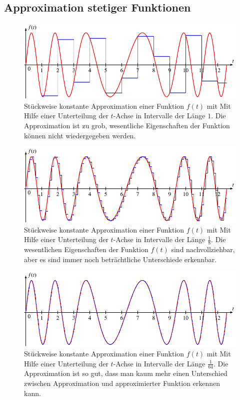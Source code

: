 \subsection{Approximation stetiger Funktionen}
\begin{figure}
\centering
\includegraphics{chapters/3-haar/images/stueckweise1.pdf}
\caption{Stückweise konstante Approximation einer Funktion $f(t)$ mit
Mit Hilfe einer Unterteilung der $t$-Achse in Intervalle der Länge $1$.
Die Approximation ist zu grob, wesentliche Eigenschaften der
Funktion können nicht wiedergegeben werden.
\label{haar:approximation1:image}}
\end{figure}
\begin{figure}
\centering
\includegraphics{chapters/3-haar/images/stueckweise8.pdf}
\caption{Stückweise konstante Approximation einer Funktion $f(t)$ mit
Mit Hilfe einer Unterteilung der $t$-Achse in Intervalle der Länge $\frac18$.
Die wesentlichen Eigenschaften der Funktion $f(t)$ sind nachvollziehbar,
aber es sind immer noch beträchtliche Unterschiede erkennbar.
\label{haar:approximation8:image}}
\end{figure}
\begin{figure}
\centering
\includegraphics{chapters/3-haar/images/stueckweise64.pdf}
\caption{Stückweise konstante Approximation einer Funktion $f(t)$ mit
Mit Hilfe einer Unterteilung der $t$-Achse in Intervalle der Länge $\frac1{64}$.
Die Approximation ist so gut, dass man kaum mehr einen Unterschied
zwischen Approximation und approximierter Funktion erkennen kann.
\label{haar:approximation64:image}}
\end{figure}
